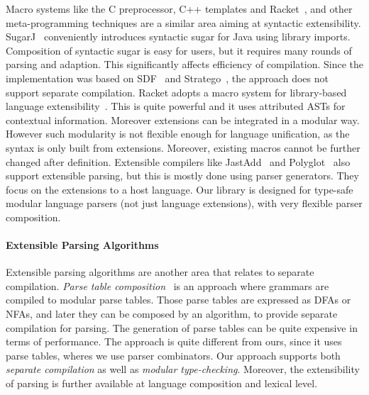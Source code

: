 Macro systems like the C preprocessor, C++ templates and
Racket~\cite{Tobin-Hochstadt2011}, and other meta-programming
techniques are a similar area aiming at syntactic extensibility.
SugarJ~\cite{Erdweg2011} conveniently introduces syntactic sugar for
Java using library imports. Composition of syntactic sugar is easy for
users, but it requires many rounds of parsing and adaption. This
significantly affects efficiency of compilation. Since the
implementation was based on SDF~\cite{Heering1989} and
Stratego~\cite{Visser2001}, the approach does not support separate
compilation. Racket adopts a macro system for library-based language
extensibility~\cite{Tobin-Hochstadt2011}. This is quite powerful and it uses 
attributed ASTs for contextual
information. Moreover extensions can be integrated in a modular
way. However such modularity is not flexible enough for language
unification, as the syntax is only built from extensions.  Moreover,
existing macros cannot be further changed after
definition.   Extensible
compilers like JastAdd~\cite{Ekman2007} and
Polyglot~\cite{Nystrom2003} also support extensible parsing, but this
is mostly done using parser generators. They focus on the
extensions to a host language. Our library is designed for type-safe 
modular language parsers (not just language 
extensions), with very flexible parser composition.


\paragraph{Extensible Parsing Algorithms}
Extensible parsing algorithms are another area that relates to
separate compilation. 
\textit{Parse table composition}~\cite{Bravenboer2009} 
is an approach where grammars are compiled to
modular parse tables. Those parse tables are expressed as DFAs
or NFAs, and later they can be composed by an algorithm, to provide
separate compilation for parsing. The generation of parse tables can
be quite expensive in terms of performance. The approach 
is quite different from ours, since it uses parse
 tables, wheres we use parser combinators. 
Our approach supports both
\emph{separate compilation} as well as \emph{modular
  type-checking}. Moreover, the extensibility of parsing is further
available at language composition and lexical level.

